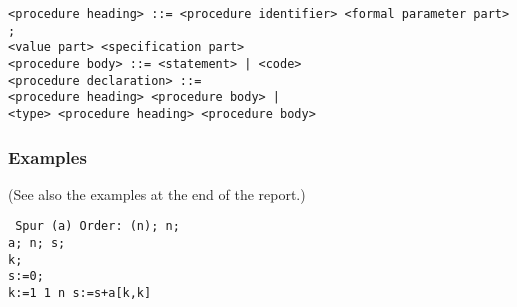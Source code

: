 \documentclass[a4paper,11pt]{article}
\begin{document}
\begin{flushleft}
\vspace{0.2em}\texttt{<procedure heading> ::= <procedure identifier> <formal parameter part> ;\\
  \hspace{1.0cm}<value part> <specification part>}\\

\vspace{0.2em}\texttt{<procedure body> ::= <statement> | <code>}\\

\vspace{0.2em}\texttt{<procedure declaration> ::=\\
  \hspace{1.0cm} <procedure heading> <procedure body> |\\
  \hspace{1.0cm}<type>  <procedure heading> <procedure body>}\\

\end{flushleft}


\subsubsection{Examples}
\label{LblProcedureDeclarationsExamples}

(See also the examples at the end of the report.)

\begin{flushleft}
\texttt{ Spur (a) Order: (n);  n;\\
 a;  n;  s;\\
  k;\\
\hspace{1.25cm}s:=0;\\
\hspace{1.25cm} k:=1  1  n  s:=s+a[k,k]\\
\\
}\end{flushleft}
\end{document}
